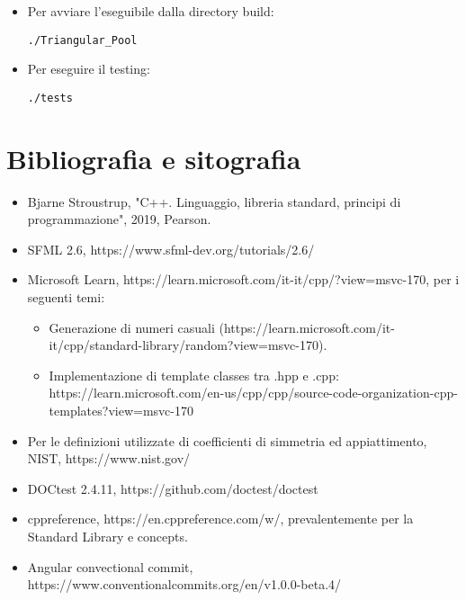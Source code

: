 \documentclass{article}
\begin{document}
\begin{itemize}
\item Per avviare l'eseguibile dalla directory build:
    \begin{lstlisting}[style=wsl]
./Triangular_Pool
\end{lstlisting}

\item Per eseguire il testing:
    \begin{lstlisting}[style=wsl]
./tests
\end{lstlisting}

\end{itemize}


\section{Bibliografia e sitografia}

\begin{itemize}
    \item Bjarne Stroustrup, "C++. Linguaggio, libreria standard, principi di programmazione", 2019, Pearson.
    \item SFML 2.6, https://www.sfml-dev.org/tutorials/2.6/
    \item Microsoft Learn, https://learn.microsoft.com/it-it/cpp/?view=msvc-170, per i seguenti temi:
    \begin{itemize}
        \item Generazione di numeri casuali (https://learn.microsoft.com/it-it/cpp/standard-library/random?view=msvc-170).
        \item Implementazione di template classes tra .hpp e .cpp:
        https://learn.microsoft.com/en-us/cpp/cpp/source-code-organization-cpp-templates?view=msvc-170
    \end{itemize}
      \item Per le definizioni utilizzate di coefficienti di simmetria ed appiattimento, NIST, https://www.nist.gov/

      \item DOCtest 2.4.11, https://github.com/doctest/doctest
      \item cppreference, https://en.cppreference.com/w/, prevalentemente per la Standard Library e concepts.
      \item Angular convectional commit, https://www.conventionalcommits.org/en/v1.0.0-beta.4/   
\end{itemize}
\end{document}
